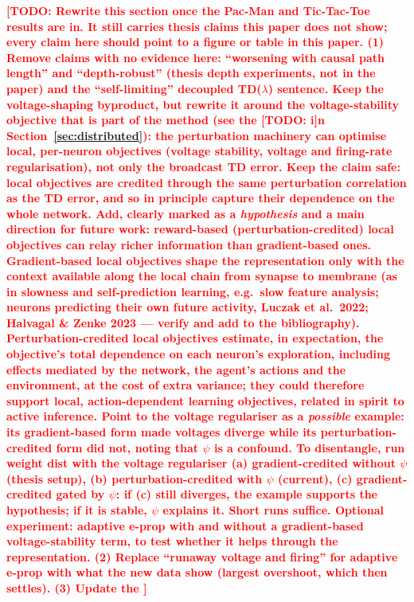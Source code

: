 \documentclass[10pt,twocolumn]{article}
\newcommand{\todo}[1]{\textcolor{red}{\bfseries[TODO: #1]}}
\begin{document}
\todo{Rewrite this section once the Pac-Man and Tic-Tac-Toe results are in.
It still carries thesis claims this paper does not show; every claim here
should point to a figure or table in this paper. (1) Remove claims with no
evidence here: ``worsening with causal path length'' and ``depth-robust''
(thesis depth experiments, not in the paper) and the ``self-limiting''
decoupled TD($\lambda$) sentence. Keep the voltage-shaping byproduct, but
rewrite it around the voltage-stability objective that is part of the method
(see the \todo in Section~\ref{sec:distributed}): the perturbation machinery
can optimise local, per-neuron objectives (voltage stability, voltage and
firing-rate regularisation), not only the broadcast TD error. Keep the claim safe:
local objectives are credited through the same perturbation correlation as the
TD error, and so in principle capture their dependence on the whole network.
Add, clearly marked as a \emph{hypothesis} and a main direction for future
work: reward-based (perturbation-credited) local objectives can relay richer
information than gradient-based ones. Gradient-based local objectives shape the
representation only with the context available along the local chain from
synapse to membrane (as in slowness and self-prediction learning, e.g.\ slow
feature analysis; neurons predicting their own future activity, Luczak et al.\
2022; Halvagal \& Zenke 2023 --- verify and add to the bibliography). Perturbation-credited
local objectives estimate, in expectation, the objective's total dependence on
each neuron's exploration, including effects mediated by the network, the
agent's actions and the environment, at the cost of extra variance; they could
therefore support local, action-dependent learning objectives, related in
spirit to active inference. Point to the voltage regulariser as a
\emph{possible} example: its gradient-based form made voltages diverge while
its perturbation-credited form did not, noting that $\psi$ is a confound. To
disentangle, run weight dist with the voltage regulariser (a) gradient-credited
without $\psi$ (thesis setup), (b) perturbation-credited with $\psi$ (current),
(c) gradient-credited gated by $\psi$: if (c) still diverges, the example
supports the hypothesis; if it is stable, $\psi$ explains it. Short runs
suffice. Optional experiment: adaptive e-prop with and without a gradient-based
voltage-stability term, to test whether it helps through the representation.
(2) Replace ``runaway voltage and firing'' for adaptive e-prop with what the
new data show (largest overshoot, which then settles). (3) Update the
}
\end{document}
